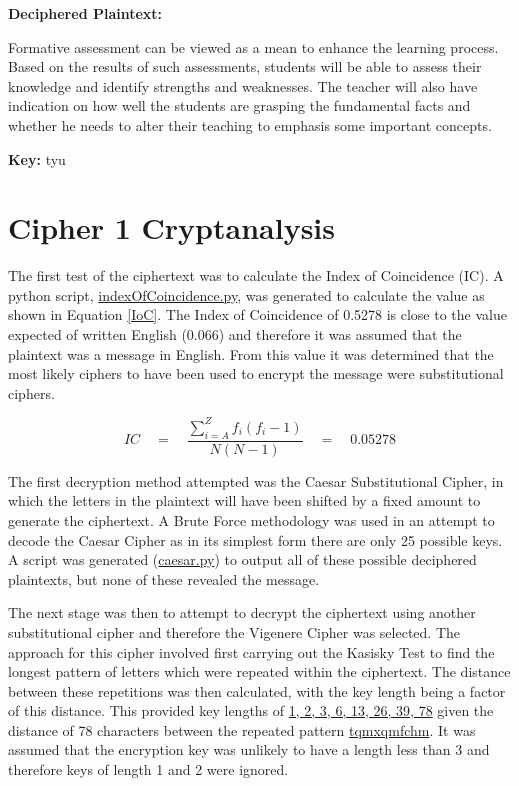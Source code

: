 \documentclass[a4paper,11pt]{article}
\begin{document}
{\bfseries{Deciphered Plaintext:}} 

Formative assessment can be viewed as a mean to enhance the learning process. Based on the results of such assessments, students will be able to assess their knowledge and identify strengths and weaknesses. The teacher will also have indication on how well the students are grasping the fundamental facts and whether he needs to alter their teaching to emphasis some important concepts.

{\bfseries{Key:}} tyu

\section{Cipher 1 Cryptanalysis} \label{Cipher 1 Cryptanalysis}

	The first test of the ciphertext was to calculate the Index of Coincidence (IC). A python script, \url{indexOfCoincidence.py}, was generated to calculate the value as shown in Equation \ref{IoC}. The Index of Coincidence of 0.5278 is close to the value expected of written English (0.066) and therefore it was assumed that the plaintext was a message in English. From this value it was determined that the most likely ciphers to have been used to encrypt the message were substitutional ciphers.

		\begin{equation}
			IC\quad =\quad \frac { \sum _{ i=A }^{ Z }{ { f }_{ i }\left( { f }_{ i }-1 \right)  }  }{ N\left( N-1 \right)  } \quad =\quad 0.05278
			\label{IoC}
		\end{equation}
	
	The first decryption method attempted was the Caesar Substitutional Cipher, in which the letters in the plaintext will have been shifted by a fixed amount to generate the ciphertext. A Brute Force methodology was used in an attempt to decode the Caesar Cipher as in its simplest form there are only 25 possible keys. A script was generated (\url{caesar.py}) to output all of these possible deciphered plaintexts, but none of these revealed the message. 
	
	The next stage was then to attempt to decrypt the ciphertext using another substitutional cipher and therefore the Vigenere Cipher was selected. The approach for this cipher involved first carrying out the Kasisky Test to find the longest pattern of letters which were repeated within the ciphertext. The distance between these repetitions was then calculated, with the key length being a factor of this distance. This provided key lengths of \url{1, 2, 3, 6, 13, 26, 39, 78} given the distance of 78 characters between the repeated pattern \url{tqmxqmfchm}. It was assumed that the encryption key was unlikely to have a length less than 3 and therefore keys of length 1 and 2 were ignored.
	
\end{document}
